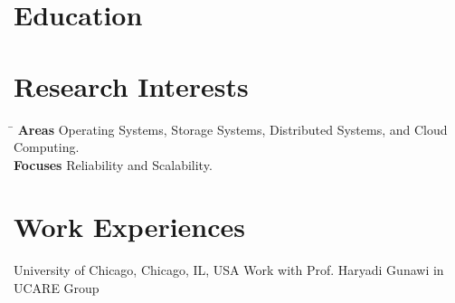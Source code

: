 \documentclass[10pt]{article} %
\begin{document}

\section{Education}





\section{Research Interests}

\begin{tabbing}
\hspace{2.5cm} \= \kill
\textbf{Areas} \> Operating Systems, Storage Systems, Distributed Systems, and Cloud Computing. \\
\textbf{Focuses} \> Reliability and Scalability.
\end{tabbing}


\section{Work Experiences}

{University of Chicago, Chicago, IL, USA}
{Work with Prof. Haryadi Gunawi in UCARE Group} 
\end{document}
